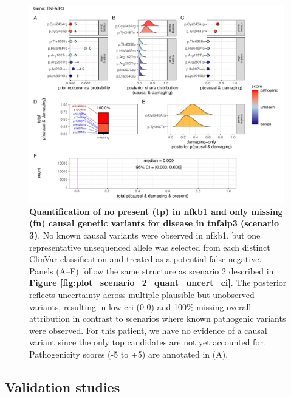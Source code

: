 \begin{figure}[ht]
  \centering
  \includegraphics[width=0.99\textwidth]{../images/plot_scenario_3_quant_uncert_ci.pdf}
  \caption{
 \textbf{Quantification of no present (\ac{tp}) in \ac{nfkb1} and only missing (\ac{fn}) causal genetic variants for disease in \ac{tnfaip3} (scenario 3)}.
No known causal variants were observed in \ac{nfkb1}, but one representative unsequenced allele was selected from each distinct ClinVar classification and treated as a potential false negative.  
Panels (A–F) follow the same structure as scenario 2 described in \textbf{Figure \ref{fig:plot_scenario_2_quant_uncert_ci}}.  
The posterior reflects uncertainty across multiple plausible but unobserved variants, resulting in low \ac{cri} (0-0) and 100\% missing overall attribution in contrast to scenarios where known pathogenic variants were observed. For this patient, we have no evidence of a causal variant since the only top candidates are not yet accounted for.
Pathogenicity scores (-5 to +5) are annotated in (A).
  }
  \label{fig:plot_scenario_3_quant_uncert_ci}
\end{figure}

\FloatBarrier
\clearpage
\subsection{Validation studies}

